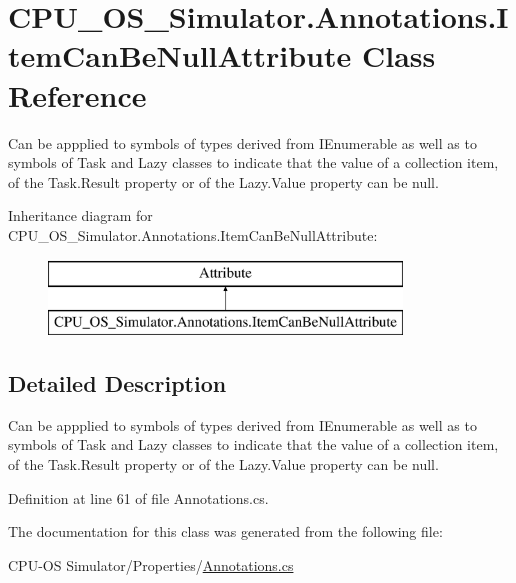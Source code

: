 \hypertarget{class_c_p_u___o_s___simulator_1_1_annotations_1_1_item_can_be_null_attribute}{}\section{C\+P\+U\+\_\+\+O\+S\+\_\+\+Simulator.\+Annotations.\+Item\+Can\+Be\+Null\+Attribute Class Reference}
\label{class_c_p_u___o_s___simulator_1_1_annotations_1_1_item_can_be_null_attribute}


Can be appplied to symbols of types derived from I\+Enumerable as well as to symbols of Task and Lazy classes to indicate that the value of a collection item, of the Task.\+Result property or of the Lazy.\+Value property can be null.  


Inheritance diagram for C\+P\+U\+\_\+\+O\+S\+\_\+\+Simulator.\+Annotations.\+Item\+Can\+Be\+Null\+Attribute\+:\begin{figure}[H]
\begin{center}
\leavevmode
\includegraphics[height=2.000000cm]{class_c_p_u___o_s___simulator_1_1_annotations_1_1_item_can_be_null_attribute}
\end{center}
\end{figure}


\subsection{Detailed Description}
Can be appplied to symbols of types derived from I\+Enumerable as well as to symbols of Task and Lazy classes to indicate that the value of a collection item, of the Task.\+Result property or of the Lazy.\+Value property can be null. 



Definition at line 61 of file Annotations.\+cs.



The documentation for this class was generated from the following file\+:\begin{DoxyCompactItemize}
\item 
C\+P\+U-\/\+O\+S Simulator/\+Properties/\hyperlink{_annotations_8cs}{Annotations.\+cs}\end{DoxyCompactItemize}
